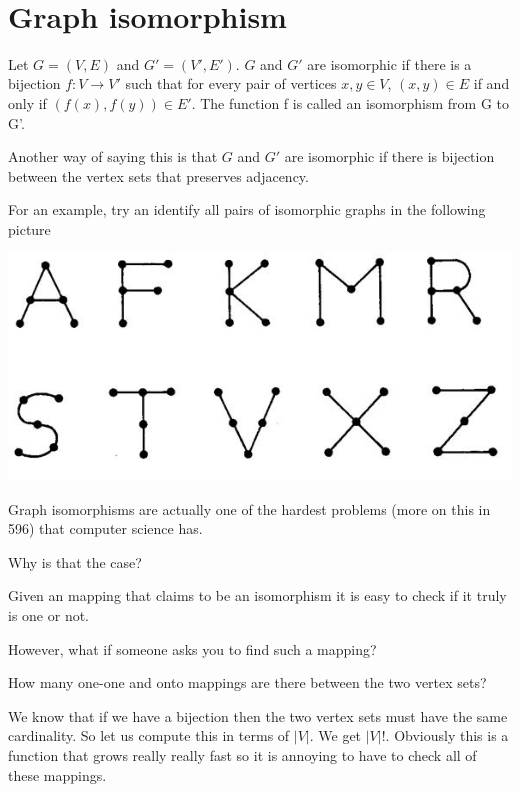 \documentclass[12pt]{article}
\begin{document}
\begin{center}
\\
\vspace{1cm}
\end{center}

\vspace{0.5cm}\noindent


\section*{Graph isomorphism}

Let $G = (V, E)$ and $G'=(V',E')$. $G$ and $G'$ are isomorphic if there is a bijection $f: V \rightarrow V'$ such that for every pair of vertices $x, y \in V$, $(x, y) \in E$ if and only if $(f(x), f(y)) \in E'$. The function f is called an isomorphism from G to G'. 

\medskip

Another way of saying this is that $G$ and $G'$ are isomorphic if there is bijection between the vertex sets that preserves adjacency.

For an example, try an identify all pairs of isomorphic graphs in the following picture


\includegraphics[scale=0.6]{iso.jpg}

Graph isomorphisms are actually one of the hardest problems (more on this in 596) that computer science has.

Why is that the case?

Given an mapping that claims to be an isomorphism it is easy to check if it truly is one or not.

However, what if someone asks you to find such a mapping?

How many one-one and onto mappings are there between the two vertex sets? 

We know that if we have a bijection then the two vertex sets must have the same cardinality. So let us compute this in terms of $|V|$. We get $|V|!$. Obviously this is a function that grows really really fast so it is annoying to have to check all of these mappings.
\end{document}
